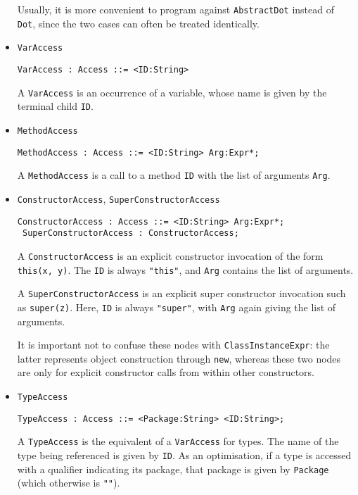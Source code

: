 \documentclass{article}
\newcommand{\nt}[1]{\texttt{#1}}
\newcommand{\child}[1]{\texttt{#1}}
\newcommand{\code}[1]{\lstinline$#1$}
\begin{document}
\begin{itemize}
  Usually, it is more convenient to program against \nt{AbstractDot} instead
  of \nt{Dot}, since the two cases can often be treated identically.

\item \nt{VarAccess}
  \begin{lstlisting}[frame=single]
 VarAccess : Access ::= <ID:String>
  \end{lstlisting}

  A \nt{VarAccess} is an occurrence of a variable, whose name is given
  by the terminal child \child{ID}.

\item \nt{MethodAccess}
  \begin{lstlisting}[frame=single]
 MethodAccess : Access ::= <ID:String> Arg:Expr*;
  \end{lstlisting}

  A \nt{MethodAccess} is a call to a method \child{ID} with the list
  of arguments \child{Arg}.

\item \nt{ConstructorAccess}, \nt{SuperConstructorAccess}
  \begin{lstlisting}[frame=single]
 ConstructorAccess : Access ::= <ID:String> Arg:Expr*;
 SuperConstructorAccess : ConstructorAccess;
  \end{lstlisting}

  A \nt{ConstructorAccess} is an explicit constructor invocation of
  the form \code{this(x, y)}. The \child{ID} is always \code{"this"},
  and \child{Arg} contains the list of arguments.

  A \nt{SuperConstructorAccess} is an explicit super constructor
  invocation such as \code{super(z)}. Here, \child{ID} is always
  \code{"super"}, with \child{Arg} again giving the list of arguments.

  It is important not to confuse these nodes with \nt{ClassInstanceExpr}:
  the latter represents object construction through \code{new}, whereas
  these two nodes are only for explicit constructor calls from within
  other constructors.

\item \nt{TypeAccess}
  \begin{lstlisting}[frame=single]
 TypeAccess : Access ::= <Package:String> <ID:String>;
  \end{lstlisting}

  A \nt{TypeAccess} is the equivalent of a \nt{VarAccess} for types. 
  The name of the type being referenced is given by \child{ID}. As an optimisation,
  if a type is accessed with a qualifier indicating its package, that
  package is given by \child{Package} (which otherwise is \code{""}).


\end{itemize}
\end{document}
